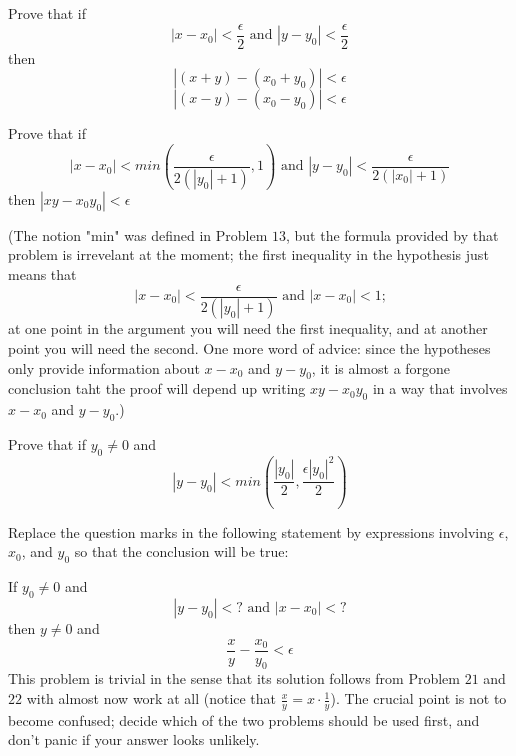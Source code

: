 \begin{tcolorbox}[title=Problem 20, breakable]
    Prove that if 
    \[|x - x_0| < \frac{\epsilon}{2} \text{ and } |y - y_0| < \frac{\epsilon}{2}\]
    then 
    \[|(x + y) - (x_0 + y_0)| < \epsilon\]
    \[|(x - y) - (x_0 - y_0)| < \epsilon\]
\end{tcolorbox}

\begin{tcolorbox}[title=Problem 21, breakable]
    Prove that if 
    \[|x - x_0| < min\left(\frac{\epsilon}{2(|y_0| + 1)}, 1\right) \text{ and } |y - y_0| < \frac{\epsilon}{2(|x_0| + 1)}\]
    then $|xy - x_0y_0| < \epsilon$
    
    (The notion "min" was defined in Problem $13$, but the formula provided by that problem 
    is irrevelant at the moment; the first inequality in the hypothesis just means that 
    \[|x - x_0| < \frac{\epsilon}{2(|y_0| + 1)} \text{ and } |x - x_0| < 1 \text{;}\]
    at one point in the argument you will need the first inequality, and at another point
    you will need the second. One more word of advice: since the hypotheses only provide information
    about $x - x_0$ and $y - y_0$, it is almost a forgone conclusion taht the proof will depend
    up writing $xy - x_0y_0$ in a way that involves $x - x_0$ and $y - y_0$.)
\end{tcolorbox}

\begin{tcolorbox}[title=Problem 22, breakable]
    Prove that if $y_0 \not = 0$ and 
    \[|y - y_0| < min\left(\frac{|y_0|}{2}, \frac{\epsilon{|y_0|^2}}{2}\right)\]
\end{tcolorbox}

\begin{tcolorbox}[title=Problem 23, breakable]
    Replace the question marks in the following statement by expressions 
    involving $\epsilon$, $x_0$, and $y_0$ so that the conclusion will be 
    true:

    If $y_0 \not = 0$ and 
    \[|y - y_0| < ? \text{ and } |x - x_0| < ?\]
    then $y \not = 0$ and 
    \[\frac{x}{y} - \frac{x_0}{y_0} < \epsilon\]
    This problem is trivial in the sense that its solution follows from 
    Problem $21$ and $22$ with almost now work at all (notice that $\frac{x}{y} = x \cdot \frac{1}{y}$).
    The crucial point is not to become confused; decide which of the two problems should be used first,
    and don't panic if your answer looks unlikely.
\end{tcolorbox}
